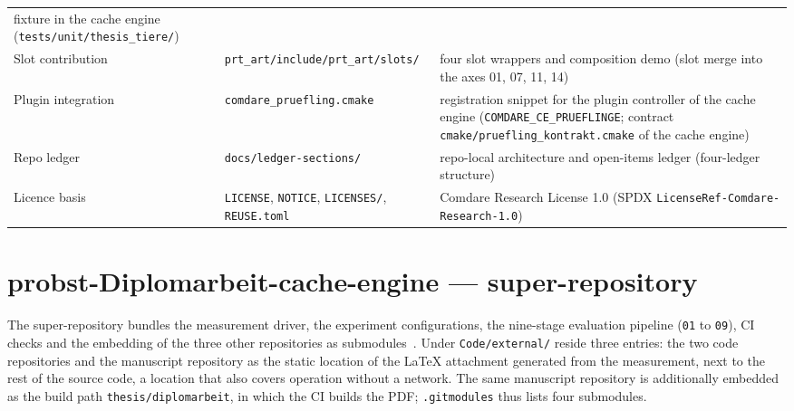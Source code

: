 {\begin{longtable}{@{}>{\raggedright\arraybackslash}p{}>{\raggedright\arraybackslash}p{}>{\raggedright\arraybackslash}p{}@{}}
fixture in the cache engine (\texttt{tests/\allowbreak{}unit/\allowbreak{}thesis\_tiere/}) \\
Slot contribution &
\texttt{prt\_art/\allowbreak{}include/\allowbreak{}prt\_art/\allowbreak{}slots/} &
four slot wrappers and composition demo (slot merge into the axes 01, 07, 11, 14) \\
Plugin integration &
\texttt{comdare\_pruefling.cmake} &
registration snippet for the plugin controller of the cache engine
(\texttt{COMDARE\_\allowbreak{}CE\_\allowbreak{}PRUEFLINGE}; contract
\texttt{cmake/\allowbreak{}pruefling\_\allowbreak{}kontrakt.cmake} of the cache engine) \\
Repo ledger &
\texttt{docs/\allowbreak{}ledger-sections/} &
repo-local architecture and open-items ledger (four-ledger structure) \\
Licence basis &
\texttt{LICENSE}, \texttt{NOTICE}, \texttt{LICENSES/}, \texttt{REUSE.toml} &
Comdare Research License 1.0 (SPDX \texttt{LicenseRef-\allowbreak{}Comdare-\allowbreak{}Research-1.0}) \\
\end{longtable}
}

\section*{probst-Diplomarbeit-cache-engine --- super-repository}

The super-repository bundles the measurement driver, the experiment configurations, the nine-stage
evaluation pipeline (\texttt{01} to \texttt{09}), CI checks and the embedding of the three other
repositories as submodules~\cite{git2026gitmodules}. Under \texttt{Code/\allowbreak{}external/} reside three
entries: the two code repositories and the manuscript repository as the static location of the LaTeX
attachment generated from the measurement, next to the rest of the source code, a location that also
covers operation without a network. The same manuscript repository is additionally embedded as the
build path \texttt{thesis/\allowbreak{}diplomarbeit}, in which the CI builds the PDF\@; \texttt{.gitmodules}
thus lists four submodules.

